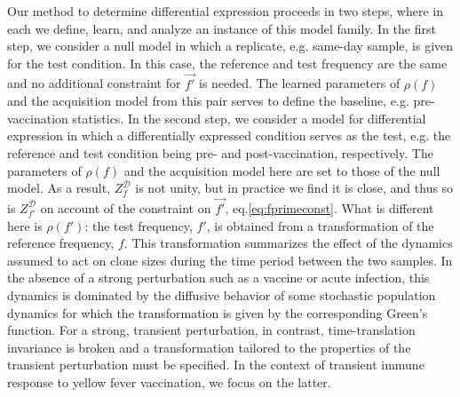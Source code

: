 \documentclass[letterpaper,english,prl,reprint,longbibliography]{revtex4-1} %
\begin{document}
Our method to determine differential expression proceeds in two steps, where in each we define, learn, and analyze an instance of this model family.
In the first step, we consider a null model in which a replicate, e.g. same-day sample, is given for the test condition. 
In this case, the reference and test frequency are the same and no additional constraint for $\vec{f'}$ is needed.
The learned parameters of $\rho(f)$ and the acquisition model from this pair serves to define the baseline, e.g. pre-vaccination statistics.
In the second step, we consider a model for differential expression in which a differentially expressed condition serves as the test, e.g. the reference and test condition being pre- and post-vaccination, respectively. 
The parameters of $\rho(f)$ and the acquisition model here are set to those of the null model. 
As a result, $Z^\mathcal{D}_f$ is not unity, but in practice we find it is close, and thus so is $Z^\mathcal{D}_{f'}$ on account of the constraint on $\vec{f'}$, eq.\ref{eq:fprimeconst}.  
What is different here is $\rho(f')$: the test frequency, $f'$, is obtained from a transformation of the reference frequency, $f$.  
This transformation summarizes the effect of the dynamics assumed to act on clone sizes during the time period between the two samples. 
In the absence of a strong perturbation such as a vaccine or acute infection, this dynamics is dominated by the diffusive behavior of some stochastic population dynamics for which the transformation is given by the corresponding Green's function.  
For a strong, transient perturbation, in contrast, time-translation invariance is broken and a transformation tailored to the properties of the transient perturbation must be specified. 
In the context of transient immune response to yellow fever vaccination, we focus on the latter. 
\end{document}
